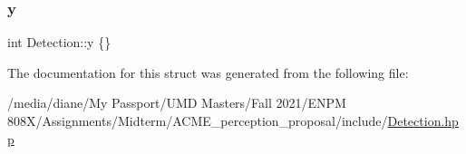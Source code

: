\mbox{\label{struct_detection_afa5d065ea13ce74dfd52c6a569313270}} 
\subsubsection{\texorpdfstring{y}{y}}
{\footnotesize\ttfamily int Detection\+::y \{\}}



The documentation for this struct was generated from the following file\+:\begin{DoxyCompactItemize}
\item 
/media/diane/\+My Passport/\+U\+M\+D Masters/\+Fall 2021/\+E\+N\+P\+M 808\+X/\+Assignments/\+Midterm/\+A\+C\+M\+E\+\_\+perception\+\_\+proposal/include/\hyperlink{_detection_8hpp}{Detection.\+hpp}\end{DoxyCompactItemize}
